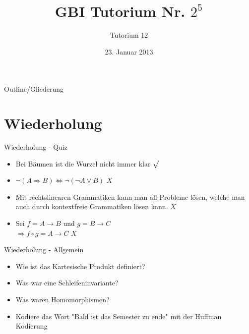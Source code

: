 

\title[Tutorium 12]{GBI Tutorium Nr. $2^5$}
\subtitle{Tutorium 12}
\date{23. Januar 2013}






	\begin{frame}
		\titlepage
	\end{frame}

	\begin{frame}{Outline/Gliederung}
		\tableofcontents
	\end{frame}	
		
	
	
	\section{Wiederholung} 
	\begin{frame} {Wiederholung - Quiz}
		\begin{itemize}
			
			\item Bei Bäumen ist die Wurzel nicht immer klar
			\only<2-> {\color{darkgreen}$\surd$}\\
			\color{black}
			\item $\neg(A \Rightarrow B) \Leftrightarrow \neg(\neg A \lor B)$
			\only<3-> {\color{red}$X$}\\
			\color{black}
			
			\item Mit rechtslinearen Grammatiken kann man all Probleme lösen, welche man auch durch kontextfreie Grammatiken lösen kann. 
			\only<4-> {\color{red}$X$}\\
			\color{black}
	
			\item Sei $f = A\rightarrow B$ und $g = B \rightarrow C$\\$ \Rightarrow f \circ g = A \rightarrow C$ 
			\only<5-> {\color{red}$X$}\\
			\color{black}
		\end{itemize}
	\end{frame}
	
	
	\begin{frame}{Wiederholung - Allgemein}
		\begin{itemize}
			\item Wie ist das Kartesische Produkt definiert?
			\pause
			\item Was war eine Schleifeninvariante?
			\pause
			\item Was waren Homomorphismen?
			\pause
			\item Kodiere das Wort "Bald ist das Semester zu ende" mit der Huffman Kodierung
			
		\end{itemize}
	\end{frame}
	
